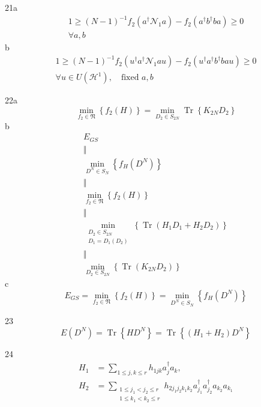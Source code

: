 \documentclass[aps,preprint]{revtex4}%
\begin{document}
21a%
\begin{gather*}
1\geq\left(  N-1\right)  ^{-1}f_{2}\left(  a^{\dagger}\mathcal{N}_{1}a\right)
-f_{2}\left(  a^{\dagger}b^{\dagger}ba\right)  \geq0\\
\forall a,b
\end{gather*}
b%
\begin{gather*}
1\geq\left(  N-1\right)  ^{-1}f_{2}\left(  u^{\dagger}a^{\dagger}%
\mathcal{N}_{1}au\right)  -f_{2}\left(  u^{\dagger}a^{\dagger}b^{\dagger
}bau\right)  \geq0\\
\forall u\in U\left(  \mathcal{H}^{1}\right)  ,\quad\text{fixed }a,b
\end{gather*}


22a%
\[
\min_{f_{2}\in\mathfrak{N}}\left\{  f_{2}\left(  H\right)  \right\}
=\min_{D_{2}\in S_{2N}}\operatorname*{Tr}\left\{  K_{2N}D_{2}\right\}
\]
b%
\begin{gather*}
E_{GS}\\
\Vert\\
\min_{D^{N}\in S_{N}}\left\{  f_{H}\left(  D^{N}\right)  \right\} \\
\Vert\\
\min_{f_{2}\in\mathfrak{N}}\left\{  f_{2}\left(  H\right)  \right\} \\
\Vert\\
\min_{\substack{D_{2}\in S_{2N}\\D_{1}=D_{1}\left(  D_{2}\right)  }}\left\{
\operatorname*{Tr}\left(  H_{1}D_{1}+H_{2}D_{2}\right)  \right\} \\
\Vert\\
\min_{D_{2}\in S_{2N}}\left\{  \operatorname*{Tr}\left(  K_{2N}D_{2}\right)
\right\}
\end{gather*}
c%
\[
E_{GS}=\min_{f_{2}\in\mathfrak{N}}\left\{  f_{2}\left(  H\right)  \right\}
=\min_{D^{N}\in S_{N}}\left\{  f_{H}\left(  D^{N}\right)  \right\}
\]


23%
\[
E\left(  D^{N}\right)  =\operatorname{Tr}\left\{  HD^{N}\right\}
=\operatorname{Tr}\left\{  \left(  H_{1}+H_{2}\right)  D^{N}\right\}
\]


24
\begin{align*}
H_{1}  &  =\sum_{1\leq j,k\leq r}h_{1jk}a_{j}^{\dagger}a_{k},\\
H_{2}  &  =\sum_{\substack{1\leq j_{1}<j_{2}\leq r\\1\leq k_{1}<k_{2}\leq
r}}h_{2j_{1}j_{2}k_{1}k_{2}}a_{j_{1}}^{\dagger}a_{j_{2}}^{\dagger}a_{k_{2}%
}a_{k_{1}}%
\end{align*}
\end{document}
